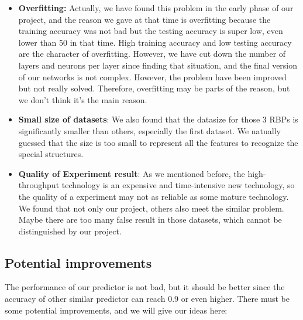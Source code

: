 \documentclass[twoside,twocolumn]{article}
\begin{document}
\begin{itemize}
    \item \textbf{Overfitting:} Actually, we have found this problem in the early phase of our project, and the reason we gave at that time is overfitting because the training accuracy was not bad but the testing accuracy is super low, even lower than 50 in that time. High training accuracy and low testing accuracy are the character of overfitting. However, we have cut down the number of layers and neurons per layer since finding that situation, and the final version of our networks is not complex. However, the problem have been improved but not really solved. Therefore, overfitting may be parts of the reason, but we don't think it's the main reason.
    \item \textbf{Small size of datasets}: We also found that the datasize for those 3 RBPs is significantly smaller than others, especially the first dataset. We natually guessed that the size is too small to represent all the features to recognize the special structures.
    \item \textbf{Quality of Experiment result}: As we mentioned before, the high-throughput technology is an expensive and time-intensive new technology, so the quality of a experiment may not as reliable as some mature technology. We found that not only our project, others also meet the similar problem. Maybe there are too many false result in those datasets, which cannot be distinguished by our project.
\end{itemize}

\subsection{Potential improvements}

The performance of our predictor is not bad, but it should be better since the accuracy of other similar predictor can reach 0.9 or even higher. There must be some potential improvements, and we will give our ideas here:
\end{document}
